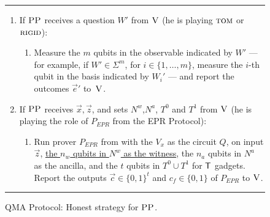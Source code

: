 \documentclass{toc}
\newcommand{\rigid}{\textsc{rigid}}
\newcommand{\tom}{\textsc{tom}}
\newcommand{\ver}{\textsc{V}}
\newcommand{\pp}{\textsc{PP}}
\newcommand{\highlight}[1]{\uline{#1}}
\begin{document}
\begin{figure}[H]
\rule[1ex]{\textwidth}{0.5pt}
\vspace{-20pt}
\begin{enumerate}
\setlength\itemsep{-0.17em}   %
\item If $\pp$ receives a question ${W}'$ from $\ver$ (he is playing $\tom$ or $\rigid$):
\vspace{-0.2cm}  %
\begin{enumerate}
     \item[]  Measure the $m$ qubits in the observable indicated by $W'$ --- for example, if $W'\in\Sigma^m$, for $i\in \{1,\ldots,m\}$, measure the $i$-th qubit in the basis indicated by $W_i'$ --- and report
       the outcomes $\vec{e}'$ to~$\ver$.
\end{enumerate}
\item If $\pp$ receives $\vec{x}, \vec{z}$, and sets $N^w$,$N^a$, $T^0$ and $T^1$ from $\ver$ (he is playing the role of $P_{EPR}$ from the EPR Protocol):
\vspace{-0.2cm}  %
\begin{enumerate}
     \item[] Run  prover $P_{EPR}$ from
 with the $V_x$ as the circuit $Q$, on input $\vec{z}$, \highlight{the $n_w$ qubits in $N^w$ as the witness}, the $n_a$ qubits in 
        $N^a$ as the ancilla, and the $t$ qubits in $T^0\cup T^1$ for $\sf T$ gadgets.
     Report the outputs $\vec{c}\in\{0,1\}^t$ and $c_f\in\{0,1\}$ of $P_{EPR}$  to $\ver$. 
\end{enumerate}
\end{enumerate}
\rule[2ex]{\textwidth}{0.5pt}\vspace{-.5cm}
\caption{QMA Protocol: Honest strategy for $\pp$.}\label{fig:qma-protocol-PP}
\end{figure}

\clearpage
\end{document}
